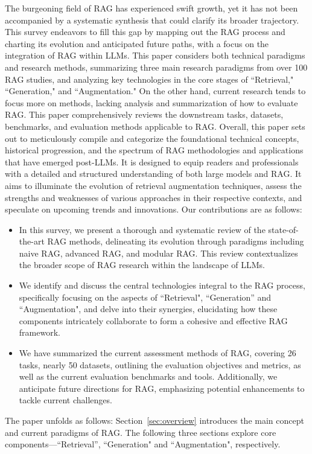 The burgeoning field of RAG has experienced swift growth, yet it has not been accompanied by a systematic synthesis that could clarify its broader trajectory. This survey endeavors to fill this gap by mapping out the RAG process and charting its evolution and anticipated future paths, with a focus on the integration of RAG within LLMs. This paper considers both technical paradigms and research methods, summarizing three main research paradigms from over 100 RAG studies, and analyzing key technologies in the core stages of ``Retrieval," ``Generation," and ``Augmentation." On the other hand, current research tends to focus more on methods, lacking analysis and summarization of how to evaluate RAG. This paper comprehensively reviews the downstream tasks, datasets, benchmarks, and evaluation methods applicable to RAG. Overall, this paper sets out to meticulously compile and categorize the foundational technical concepts, historical progression, and the spectrum of RAG methodologies and applications that have emerged post-LLMs. It is designed to equip readers and professionals with a detailed and structured understanding of both large models and RAG. It aims to illuminate the evolution of retrieval augmentation techniques, assess the strengths and weaknesses of various approaches in their respective contexts, and speculate on upcoming trends and innovations.
Our contributions are as follows:
\begin{itemize}
\item In this survey, we present a thorough and systematic review of the state-of-the-art RAG methods, delineating its evolution through paradigms including naive RAG, advanced RAG, and modular RAG. This review contextualizes the broader scope of RAG research within the landscape of LLMs.
\item We identify and discuss the central technologies integral to the RAG process, specifically focusing on the aspects of ``Retrieval", ``Generation'' and ``Augmentation", and delve into their synergies, elucidating how these components intricately collaborate to form a cohesive and effective RAG framework.
\item We have summarized the current assessment methods of RAG, covering 26 tasks, nearly 50 datasets, outlining the evaluation objectives and metrics, as well as the current evaluation benchmarks and tools. Additionally, we anticipate future directions for RAG, emphasizing potential enhancements to tackle current challenges.
\end{itemize}
The paper unfolds as follows: Section~\ref{sec:overview}  introduces the main concept and current paradigms of RAG. The following three sections explore core components—``Retrieval'', ``Generation" and ``Augmentation", respectively.
